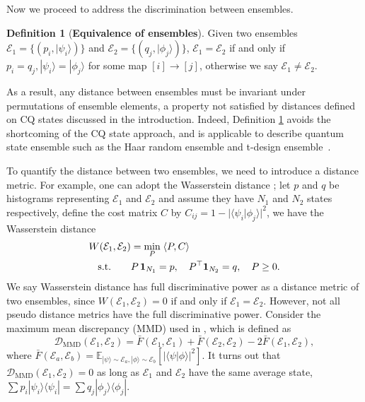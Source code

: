 \documentclass[aps,prx,reprint,superscriptaddress,amsmath,amssymb,longbibliography,floatfix]{revtex4-2}
\newcommand{\abs}[1]{\lvert #1\rvert}
\providecommand{\ket}[1]{|#1 \rangle}
\providecommand{\braket}[2]{\langle #1|#2 \rangle}
\providecommand{\ketbra}[2]{|#1\rangle \langle #2|}
\newcommand{\dsE}{\mathbb{E}}
\newcommand{\scD}{\mathcal{D}}
\newcommand{\scE}{\mathcal{E}}
\theoremstyle{plain}
\theoremstyle{definition}
\newtheorem{definition}[theorem]{Definition}
\theoremstyle{remark}
\begin{document}
Now we proceed to address the discrimination between ensembles.
\begin{definition}[\textbf{Equivalence of ensembles}]
    Given two ensembles $\scE_1 = \{(p_i,\ket{\psi_i})\}$ and $\scE_2 = \{(q_j,\ket{\phi_j})\}$, $\scE_1 = \scE_2$ if and only if $p_i=q_j, \ket{\psi_i} = \ket{\phi_j}$ for some map $[i]\rightarrow[j]$, otherwise we say $\scE_1\ne \scE_2$. \label{def: equivalence}
\end{definition}

As a result, any distance between ensembles must be invariant under permutations of ensemble elements, a property not satisfied by distances defined on CQ states discussed in the introduction. Indeed, Definition \ref{def: equivalence} avoids the shortcoming of the CQ state approach, and is applicable to describe quantum state ensemble such as the Haar random ensemble and t-design ensemble~\cite{ambainis2007quantumtdesignstwiseindependence}. 


To quantify the distance between two ensembles, we need to introduce a distance metric. For example, one can adopt the Wasserstein distance \cite{Wasserstein_PhysRevA.79.032336,Wasserstein_MAL-073,Wasserstein_villani2003topics}; let $p$ and $q$ be histograms representing $\scE_1$ and $\scE_2$ and assume they have $N_1$ and $N_2$ states respectively, define the cost matrix $C$ by $C_{ij} = 1-\abs{\braket{\psi_i}{\phi_j}}^2$, we have the Wasserstein distance
\begin{equation}
\centering
\begin{aligned}
W(\scE_1,\scE_2) &= \min_{P}\; \langle P, C\rangle \\
\text{s.t.}\qquad & P\,\mathbf{1}_{N_1} = p, \quad P^{\top}\mathbf{1}_{N_2} = q, \quad P \ge 0 .
\end{aligned}\label{eq: calculation of Wasserstein}
\end{equation}
We say Wasserstein distance has full discriminative power as a distance metric of two ensembles, since $W(\scE_1,\scE_2) = 0$ if and only if $\scE_1=\scE_2$. However, not all pseudo distance metrics have the full discriminative power. Consider the maximum mean discrepancy (MMD) \cite{MMD_JMLR:v13:gretton12a} used in \cite{QuDDPM_PhysRevLett.132.100602}, which is defined as
\begin{equation}
    \scD_{\text{MMD}}(\scE_1,\scE_2) = \bar{F}(\scE_1, \scE_1)+\bar{F}(\scE_2, \scE_2) - 2\bar{F}(\scE_1, \scE_2), \label{eq:MMD}
\end{equation}
where $\bar{F}(\scE_a, \scE_b) = \dsE_{\ket{\psi}\sim\scE_a, \ket{\phi}\sim\scE_b} [\abs{\braket{\psi}{\phi}}^2]$. It turns out that $\scD_{\text{MMD}}(\scE_1,\scE_2) =0$ as long as $\scE_1$ and $\scE_2$ have the same average state, $\sum p_i\ketbra{\psi_i}{\psi_i}=\sum q_j \ketbra{\phi_j}{\phi_j}$.
\end{document}
